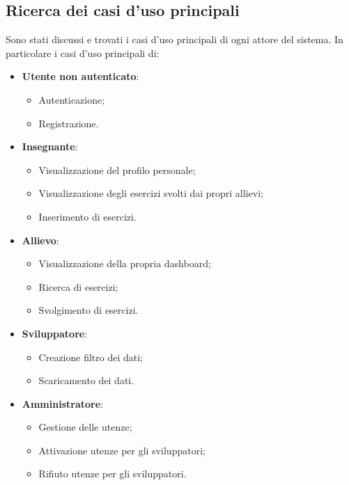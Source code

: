\documentclass[a4paper, oneside, openany, dvipsnames, table]{article}
\begin{document}
\subsection{Ricerca dei casi d'uso principali} Sono stati discussi e trovati i casi d'uso principali di ogni attore del sistema. In particolare i casi d'uso principali di:
\begin{itemize}
\item \textbf{Utente non autenticato}:
	\begin{itemize}
		\item Autenticazione;
		\item Registrazione.
	\end{itemize}
\item \textbf{Insegnante}:
	\begin{itemize}
		\item Visualizzazione del profilo personale;
		\item Visualizzazione degli esercizi svolti dai propri allievi;
		\item Inserimento di esercizi.
	\end{itemize}
\item \textbf{Allievo}:
	\begin{itemize}
		\item Visualizzazione della propria dashboard;
		\item Ricerca di esercizi;
		\item Svolgimento di esercizi.
	\end{itemize}
\item \textbf{Sviluppatore}:
	\begin{itemize}
		\item Creazione filtro dei dati;
		\item Scaricamento dei dati.
	\end{itemize}
\item \textbf{Amministratore}:
	\begin{itemize}
		\item Gestione delle utenze;
		\item Attivazione utenze per gli sviluppatori;
		\item Rifiuto utenze per gli sviluppatori.
	\end{itemize}
\end{itemize}
\newpage
\end{document}
